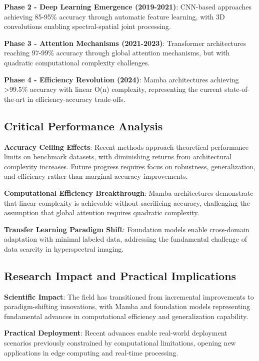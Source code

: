 \documentclass[journal]{IEEEtran}
\begin{document}
\textbf{Phase 2 - Deep Learning Emergence (2019-2021)}: CNN-based approaches achieving 85-95\% accuracy through automatic feature learning, with 3D convolutions enabling spectral-spatial joint processing.

\textbf{Phase 3 - Attention Mechanisms (2021-2023)}: Transformer architectures reaching 97-99\% accuracy through global attention mechanisms, but with quadratic computational complexity challenges.

\textbf{Phase 4 - Efficiency Revolution (2024)}: Mamba architectures achieving >99.5\% accuracy with linear O(n) complexity, representing the current state-of-the-art in efficiency-accuracy trade-offs.

\subsection{Critical Performance Analysis}

\textbf{Accuracy Ceiling Effects}: Recent methods approach theoretical performance limits on benchmark datasets, with diminishing returns from architectural complexity increases. Future progress requires focus on robustness, generalization, and efficiency rather than marginal accuracy improvements.

\textbf{Computational Efficiency Breakthrough}: Mamba architectures demonstrate that linear complexity is achievable without sacrificing accuracy, challenging the assumption that global attention requires quadratic complexity.

\textbf{Transfer Learning Paradigm Shift}: Foundation models enable cross-domain adaptation with minimal labeled data, addressing the fundamental challenge of data scarcity in hyperspectral imaging.

\subsection{Research Impact and Practical Implications}

\textbf{Scientific Impact}: The field has transitioned from incremental improvements to paradigm-shifting innovations, with Mamba and foundation models representing fundamental advances in computational efficiency and generalization capability.

\textbf{Practical Deployment}: Recent advances enable real-world deployment scenarios previously constrained by computational limitations, opening new applications in edge computing and real-time processing.
\end{document}
